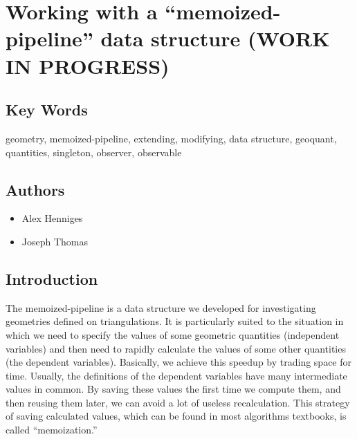                       


\section*{Working with a ``memoized-pipeline'' data structure (WORK IN
PROGRESS)}

\label{f0}

\subsection*{Key Words}

geometry, memoized-pipeline, extending, modifying, data structure, geoquant,
quantities, singleton, observer, observable

\subsection*{Authors}

\begin{itemize}
\item Alex Henniges

\item Joseph Thomas
\end{itemize}

\subsection*{Introduction}

The memoized-pipeline is a data structure we developed for investigating
geometries defined on triangulations. It is particularly suited to the
situation in which we need to specify the values of some geometric
quantities (independent variables) and then need to rapidly calculate the
values of some other quantities (the dependent variables). Basically, we
achieve this speedup by trading space for time. Usually, the definitions of
the dependent variables have many intermediate values in common. By saving
these values the first time we compute them, and then reusing them later, we
can avoid a lot of useless recalculation. This strategy of saving calculated
values, which can be found in most algorithms textbooks, is called
``memoization.''

